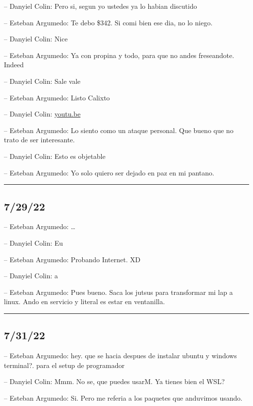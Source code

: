 -- Danyiel Colin: Pero si, segun yo ustedes ya lo habian discutido

-- Esteban Argumedo: Te debo \$342. Si comi bien ese dia, no lo niego.

-- Danyiel Colin: Nice

-- Esteban Argumedo: Ya con propina y todo, para que no andes
freseandote. Indeed

-- Danyiel Colin: Sale vale

-- Esteban Argumedo: Listo Calixto

-- Danyiel Colin: \href{https://youtu.be/dH5FE_gqJ5I}{youtu.be}

-- Esteban Argumedo: Lo siento como un ataque personal. Que bueno que no
trato de ser interesante.

-- Danyiel Colin: Esto es objetable

-- Esteban Argumedo: Yo solo quiero ser dejado en paz en mi pantano.

\begin{center}\rule{0.5\linewidth}{0.5pt}\end{center}

\hypertarget{section-135}{%
\subsection{7/29/22}\label{section-135}}

-- Esteban Argumedo: \ldots{}

-- Danyiel Colin: Eu

-- Esteban Argumedo: Probando Internet. XD

-- Danyiel Colin: a

-- Esteban Argumedo: Pues bueno. Saca los jutsus para transformar mi lap
a linux. Ando en servicio y literal es estar en ventanilla.

\begin{center}\rule{0.5\linewidth}{0.5pt}\end{center}

\hypertarget{section-136}{%
\subsection{7/31/22}\label{section-136}}

-- Esteban Argumedo: hey. que se hacia despues de instalar ubuntu y
windows terminal?. para el setup de programador

-- Danyiel Colin: Mmm. No se, que puedes usarM. Ya tienes bien el WSL?

-- Esteban Argumedo: Si. Pero me referia a los paquetes que anduvimos
usando.


